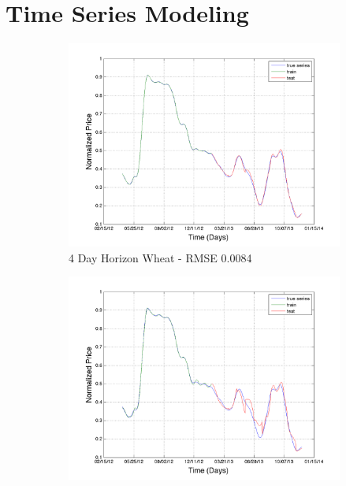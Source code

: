 \chapter{Time Series Modeling}
\label{ts_model}



\begin{figure}
        \centering
        \begin{subfigure}[b]{0.5\textwidth}
                \includegraphics[width=\textwidth]{img/model/wheat/model3_3/pred_4}
                \caption{4 Day Horizon Wheat - RMSE 0.0084}
                \label{fig:gull}
        \end{subfigure}%
           \begin{subfigure}[b]{0.5\textwidth}
                \includegraphics[width=\textwidth]{img/model/wheat/model3_3/pred_7}

\end{subfigure}
\end{figure}

